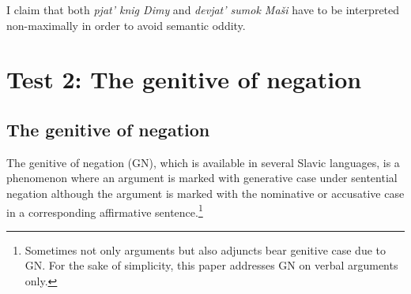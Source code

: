 \documentclass[output=paper,
colorlinks,
citecolor=brown,
newtxmath
]{langscibook}
\begin{document}
\noindent I claim that both \textit{pjat' knig Dimy} and \textit{devjat' sumok Maši} have to be interpreted non-maximally in order to avoid semantic oddity.

\section{Test 2: The genitive of negation}\label{secGN}

\subsection{The genitive of negation}

The genitive of negation (GN), which is available in several Slavic languages, is a phenomenon where an argument is marked with generative case under sentential negation although the argument is marked with the nominative or accusative case in a corresponding affirmative sentence.\footnote{Sometimes not only arguments but also adjuncts bear genitive case due to GN. For the sake of simplicity, this paper addresses GN on verbal arguments only.}
\end{document}
